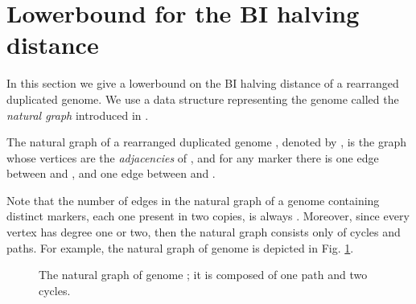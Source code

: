 \documentclass{llncs}
\newcommand{\fst}[1]{ \ensuremath{#1} }
\newcommand{\snd}[1]{ \ensuremath{\overline{#1}} }
\newcommand\paff[2]{\ensuremath{\fst{#1}~~\fst{#2}}}
\newcommand\pasf[2]{\ensuremath{\snd{#1}~~\fst{#2}}}
\newcommand\pafs[2]{\ensuremath{\fst{#1}~~\snd{#2}}}
\newcommand\pass[2]{\ensuremath{\snd{#1}~~\snd{#2}}}
\begin{document}
\section{Lowerbound for the BI halving distance}
\label{sec:lb}

In this section we give a lowerbound on the BI halving distance of a rearranged duplicated genome. We use a data structure representing the genome called the \emph{natural graph} introduced in \cite{Mixtacki08}. 


\begin{definition}
The natural graph of a rearranged duplicated genome , denoted by , is the graph whose vertices are the \emph{adjacencies} of , and for any marker  there is one edge between   and  , and  one edge between   and  .
\end{definition}


Note that the number of edges in the natural graph of a genome  containing  distinct markers, each one present in two copies, is always . Moreover, since every vertex has degree one or two, then the natural graph consists only of cycles and paths. For example, the natural graph of genome  is depicted in Fig. \ref{fig:NGdef}.

 
\begin{figure}[htbp]
    \centering
{}

\caption{The natural graph of genome  ; it is composed of one path and two cycles.}
\label{fig:NGdef}
\end{figure}
\end{document}
